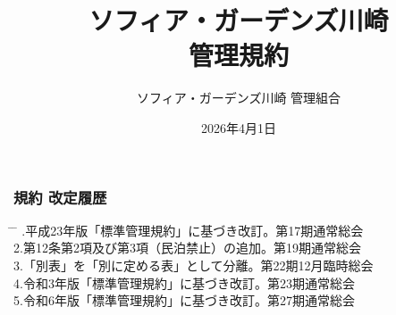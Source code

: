\documentclass[
  luatex,
  paper=a4paper,
  fontsize=11pt,
  jafontsize=11pt,
  jlreq_notes,
]{jlreq}
\renewcommand{\baselinestretch}{0.9}
\begin{document}
  \pagestyle{empty} %
  \title{ソフィア・ガーデンズ川崎\\管理規約}
  \date{2026年4月1日}
  \maketitle
  \thispagestyle{empty}
  \vfill      %

  \begin{center}
    \vspace*{3\baselineskip}
    \author{\Large ソフィア・ガーデンズ川崎 管理組合}
  \end{center}
  \vspace*{2\baselineskip}
  { \renewcommand{\baselinestretch}{0.8}\selectfont   %
    \subsubsection*{ 規約 改定履歴 }
    \small
    \vspace*{1\baselineskip}
    \begin{tabbing}
      \hspace{5mm} \= \hspace{90mm} \= \hspace{100mm} .\>平成23年版「標準管理規約」に基づき改訂。\>第17期通常総会\\
      2.\>第12条第2項及び第3項（民泊禁止）の追加。\>第19期通常総会\\
      3.\>「別表」を「別に定める表」として分離。\>第22期12月臨時総会\\
      4.\>令和3年版「標準管理規約」に基づき改訂。\>第23期通常総会\\
      5.\>令和6年版「標準管理規約」に基づき改訂。\>第27期通常総会\\
    \end{tabbing}
  }
  \clearpage

  { \renewcommand{\baselinestretch}{0.8}\selectfont
    \tableofcontents        %
  }
  \clearpage

  \setcounter{page}{1}    %
  \pagestyle{plain}       %
\end{document}
